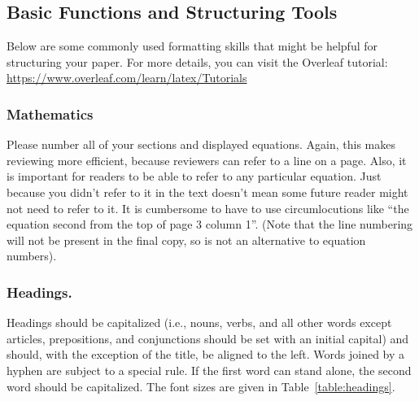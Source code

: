\subsection{Basic Functions and Structuring Tools}

Below are some commonly used formatting skills that might be helpful for structuring your paper. For more details, you can visit the Overleaf tutorial: \url{https://www.overleaf.com/learn/latex/Tutorials}

\subsubsection{Mathematics}

Please number all of your sections and displayed equations.  Again,
this makes reviewing more efficient, because reviewers can refer to a line on a page.  Also, it is important for readers to be able to refer to any particular equation.  Just because you didn't refer to it in the text doesn't mean some future reader might not need to refer to it.  It is cumbersome to have to use circumlocutions like ``the equation second from the top of page 3 column 1''.  (Note that the line numbering will not be present in the final copy, so is not an alternative to equation numbers).

\subsubsection{Headings.}

Headings should be capitalized (i.e., nouns, verbs, and all other words except articles, prepositions, and conjunctions should be set with an initial capital) and should,
with the exception of the title, be aligned to the left.
Words joined by a hyphen are subject to a special rule. If the first word can stand alone, the second word should be capitalized.
The font sizes are given in Table~\ref{table:headings}.

\setlength{\tabcolsep}{4pt}

